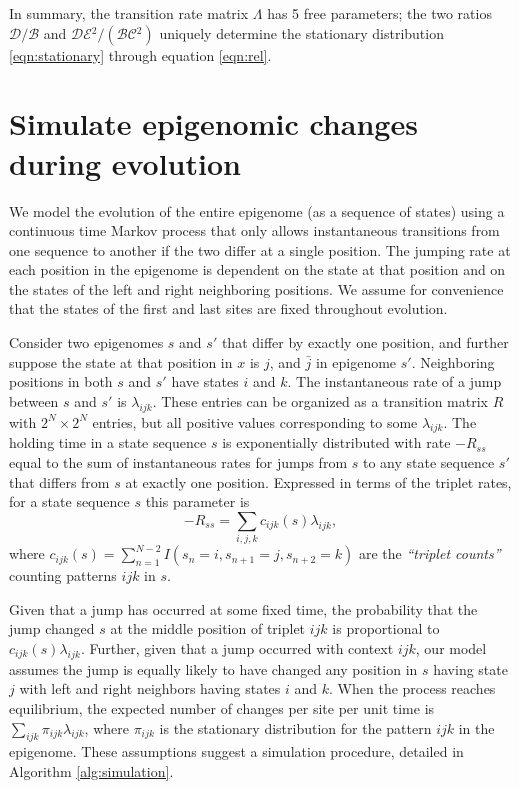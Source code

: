 \documentclass[11pt]{article}
\newcommand{\birth}{\ensuremath{\mathcal{B}}}
\newcommand{\death}{\ensuremath{\mathcal{D}}}
\newcommand{\expansion}{\ensuremath{\mathcal{E}}}
\newcommand{\contraction}{\ensuremath{\mathcal{C}}}
\begin{document}
In summary, the transition rate matrix $\Lambda$ has 5 free
parameters; the two ratios $\death{}/\birth{}$ and
$\death{}\expansion{}^2/(\birth{}\contraction{}^2)$ uniquely
determine the stationary distribution \eqref{eqn:stationary} through
equation \eqref{eqn:rel}.

\section{Simulate epigenomic changes during evolution}


We model the evolution of the entire epigenome (as a sequence of
states) using a continuous time Markov process that only allows
instantaneous transitions from one sequence to another if the two
differ at a single position. The jumping rate at each position in the
epigenome is dependent on the state at that position and on the states
of the left and right neighboring positions. We assume for convenience
that the states of the first and last sites are fixed throughout
evolution.

Consider two epigenomes $s$ and $s'$ that differ by exactly one
position, and further suppose the state at that position in $x$ is
$j$, and $\bar{j}$ in epigenome $s'$. Neighboring positions in both
$s$ and $s'$ have states $i$ and $k$. The instantaneous rate of a jump
between $s$ and $s'$ is $\lambda_{ijk}$. These entries can be
organized as a transition matrix $R$ with $2^N\times 2^N$ entries, but
all positive values corresponding to some $\lambda_{ijk}$. The holding
time in a state sequence $s$ is exponentially distributed with rate
$-R_{ss}$ equal to the sum of instantaneous rates for jumps from $s$
to any state sequence $s'$ that differs from $s$ at exactly one
position. Expressed in terms of the triplet rates, for a state
sequence $s$ this parameter is
\[
-R_{ss} = \sum_{i,j,k}c_{ijk}(s)\lambda_{ijk},
\]
where $c_{ijk}(s) = \sum_{n=1}^{N-2}I(s_{n}=i, s_{n+1}=j, s_{n+2}=k)$
are the {\it ``triplet counts''} counting patterns $ijk$ in $s$.

Given that a jump has occurred at some fixed time, the probability
that the jump changed $s$ at the middle position of triplet $ijk$ is
proportional to $c_{ijk}(s)\lambda_{ijk}$. Further, given that a jump
occurred with context $ijk$, our model assumes the jump is equally
likely to have changed any position in $s$ having state $j$ with left
and right neighbors having states $i$ and $k$.
When the process reaches equilibrium, the expected number of changes
per site per unit time is
$\sum_{ijk}\pi_{ijk}\lambda_{ijk}$, where $\pi_{ijk}$ is the
stationary distribution for the pattern $ijk$ in the epigenome.
These assumptions suggest a simulation procedure, detailed in
Algorithm \ref{alg:simulation}.
\end{document}
